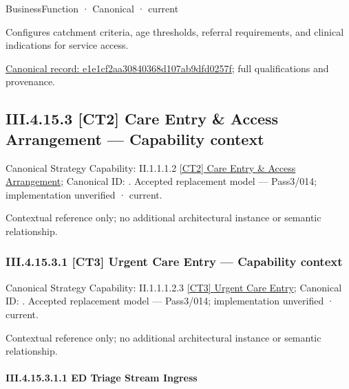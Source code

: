\label{element:e1e1cf2aa30840368d107ab9dfd0257f}
{\small BusinessFunction · Canonical · current}\par

Configures catchment criteria, age thresholds, referral requirements, and clinical indications for service access.


{\footnotesize \href{../../../../../../../../continuum/business/business-function/e1e1cf2aa30840368d107ab9dfd0257f.md}{Canonical record: e1e1cf2aa30840368d107ab9dfd0257f}; full qualifications and provenance.}\par
\subsection*{III.4.15.3 [CT2] Care Entry \& Access Arrangement — Capability context}
\label{navigation:III.4.15.3}

{\small Canonical Strategy Capability: II.1.1.1.2 \hyperref[element:199f8d09f6304730a17cfe6ce79a9282]{[CT2] Care Entry \& Access Arrangement}; Canonical ID: \texttt{}. Accepted replacement model — Pass3/014; implementation unverified · current.}\par
Contextual reference only; no additional architectural instance or semantic relationship.\par
\subsubsection*{III.4.15.3.1 [CT3] Urgent Care Entry — Capability context}
\label{navigation:III.4.15.3.1}

{\small Canonical Strategy Capability: II.1.1.1.2.3 \hyperref[element:d0cb74fc4459410d8119b08f72f66037]{[CT3] Urgent Care Entry}; Canonical ID: \texttt{}. Accepted replacement model — Pass3/014; implementation unverified · current.}\par
Contextual reference only; no additional architectural instance or semantic relationship.\par
\paragraph*{III.4.15.3.1.1 ED Triage Stream Ingress}
\label{navigation:III.4.15.3.1.1}

